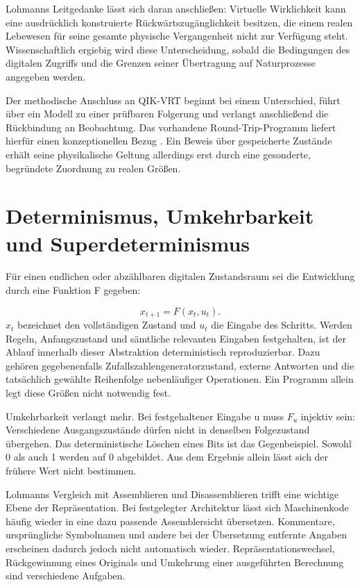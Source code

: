 Lohmanns Leitgedanke lässt sich daran anschließen: Virtuelle Wirklichkeit kann eine ausdrücklich konstruierte Rückwärtszugänglichkeit besitzen, die einem realen Lebewesen für seine gesamte physische Vergangenheit nicht zur Verfügung steht. Wissenschaftlich ergiebig wird diese Unterscheidung, sobald die Bedingungen des digitalen Zugriffs und die Grenzen seiner Übertragung auf Naturprozesse angegeben werden.

Der methodische Anschluss an QIK-VRT beginnt bei einem Unterschied, führt über ein Modell zu einer prüfbaren Folgerung und verlangt anschließend die Rückbindung an Beobachtung. Das vorhandene Round-Trip-Programm liefert hierfür einen konzeptionellen Bezug \cite{Q1}. Ein Beweis über gespeicherte Zustände erhält seine physikalische Geltung allerdings erst durch eine gesonderte, begründete Zuordnung zu realen Größen.

\section{Determinismus, Umkehrbarkeit und Superdeterminismus}\label{de:sec2}
Für einen endlichen oder abzählbaren digitalen Zustandsraum sei die Entwicklung durch eine Funktion F gegeben:

\begin{equation}\label{de:eq1}
x_{t+1}=F(x_t,u_t).
\end{equation}
\(x_t\) bezeichnet den vollständigen Zustand und \(u_t\) die Eingabe des Schritts. Werden Regeln, Anfangszustand und sämtliche relevanten Eingaben festgehalten, ist der Ablauf innerhalb dieser Abstraktion deterministisch reproduzierbar. Dazu gehören gegebenenfalls Zufallszahlengeneratorzustand, externe Antworten und die tatsächlich gewählte Reihenfolge nebenläufiger Operationen. Ein Programm allein legt diese Größen nicht notwendig fest.

Umkehrbarkeit verlangt mehr. Bei festgehaltener Eingabe u muss \(F_u\) injektiv sein: Verschiedene Ausgangszustände dürfen nicht in denselben Folgezustand übergehen. Das deterministische Löschen eines Bits ist das Gegenbeispiel. Sowohl 0 als auch 1 werden auf 0 abgebildet. Aus dem Ergebnis allein lässt sich der frühere Wert nicht bestimmen.

Lohmanns Vergleich mit Assemblieren und Disassemblieren trifft eine wichtige Ebene der Repräsentation. Bei festgelegter Architektur lässt sich Maschinenkode häufig wieder in eine dazu passende Assemblersicht übersetzen. Kommentare, ursprüngliche Symbolnamen und andere bei der Übersetzung entfernte Angaben erscheinen dadurch jedoch nicht automatisch wieder. Repräsentationswechsel, Rückgewinnung eines Originals und Umkehrung einer ausgeführten Berechnung sind verschiedene Aufgaben.

